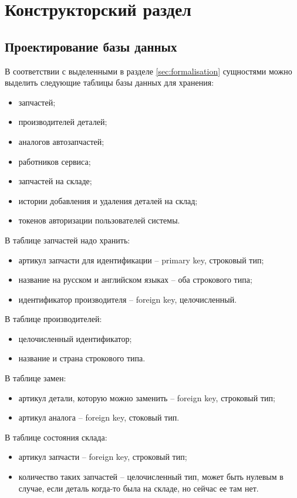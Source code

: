 \chapter{Конструкторский раздел}

\section{Проектирование базы данных}

В соответствии с выделенными в разделе \ref{sec:formalisation} сущностями можно выделить следующие таблицы базы данных для хранения:
\begin{itemize}
	\item запчастей;
	\item производителей деталей;
	\item аналогов автозапчастей;
	\item работников сервиса;
	\item запчастей на складе;
	\item истории добавления и удаления деталей на склад;
	\item токенов авторизации пользователей системы.
\end{itemize}

В таблице запчастей надо хранить:
\begin{itemize}
	\item артикул запчасти для идентификации -- primary key, строковый тип;
	\item название на русском и английском языках -- оба строкового типа;
	\item идентификатор производителя -- foreign key, целочисленный.
\end{itemize}

В таблице производителей:
\begin{itemize}
	\item целочисленный идентификатор;
	\item название и страна строкового типа.
\end{itemize}

В таблице замен:
\begin{itemize}
	\item артикул детали, которую можно заменить -- foreign key, строковый тип;
	\item артикул аналога -- foreign key, стоковый тип.
\end{itemize}

В таблице состояния склада:
\begin{itemize}
	\item артикул запчасти -- foreign key, строковый тип;
	\item количество таких запчастей -- целочисленный тип, может быть нулевым в случае, если деталь когда-то была на складе, но сейчас ее там нет.
\end{itemize}

